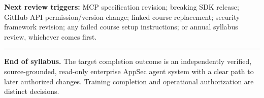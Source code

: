 \documentclass[
  10pt,
]{article}
\begin{document}
\textbf{Next review triggers:} MCP specification revision; breaking SDK
release; GitHub API permission/version change; linked course
replacement; security framework revision; any failed course setup
instructions; or annual syllabus review, whichever comes first.

\begin{center}\rule{0.5\linewidth}{0.5pt}\end{center}

\textbf{End of syllabus.} The target completion outcome is an
independently verified, source-grounded, read-only enterprise AppSec
agent system with a clear path to later authorized changes. Training
completion and operational authorization are distinct decisions.
\end{document}
